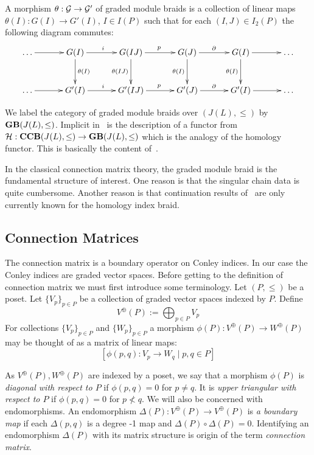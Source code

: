A morphism $\theta:{\mathcal G}\to {\mathcal G}'$ of graded module braids is a collection of linear maps $\theta(I):G(I)\to G'(I)$, $I\in I(P)$ such that for each $(I,J)\in I_2(P)$ the following diagram commutes:
\[
\xymatrixrowsep{0.4in}
\xymatrixcolsep{0.45in}
\xymatrix{
\ldots \ar@{->}[r] & G(I) \ar@{->}[d]^{\theta(I)} \ar@{->}[r]^{i} & G(IJ) \ar@{->}[d]_{\theta(IJ)} \ar@{->}[r]^{p} & G(J) \ar@{->}[d]_{\theta(I)} \ar@{->}[r]^{\partial} & G(I) \ar@{->}[d]_{\theta(I)} \ar@{->}[r] & \ldots\\
\ldots \ar@{->}[r] & G'(I) \ar@{->}[r]^{i} & G'(IJ) \ar@{->}[r]^{p} & G'(J) \ar@{->}[r]^{\partial} & G'(I) \ar@{->}[r] &\ldots
}
\]

We label the category of graded module braids over $(J(L),\leq)$ by ${\bf GB}(J(L),\leq)$.  Implicit in~\cite{fran} is the description of a functor from ${\mathcal H}:{\bf CCB}(J(L),\leq)\to {\bf GB}(J(L),\leq)$ which is the analogy of the homology functor.  This is basically the content of~\cite[Proposition 2.7]{fran}.


\begin{rem}
In the classical connection matrix theory, the graded module braid is the fundamental structure of interest.  One reason is that the singular chain data is quite cumbersome.  Another reason is that continuation results of~\cite{fran3}  are only currently known for the homology index braid.
\end{rem}


\subsection{Connection Matrices}

The connection matrix is a boundary operator on Conley indices.  In our case the Conley indices are graded vector spaces.  Before getting to the definition of connection matrix we must first introduce some terminology.  Let $(P,\leq)$ be a poset.  Let $\{V_p\}_{p\in P}$ be a collection of graded vector spaces indexed by $P$.  Define $$V^\oplus(P) := \bigoplus_{p\in P} V_p$$  For collections $\{V_p\}_{p\in P}$ and $\{W_p\}_{p\in P}$ a morphism $\phi(P):V^\oplus(P)\to W^\oplus(P)$ may be thought of as a matrix of linear maps: $$[\phi(p,q):V_p\to W_q\mid p,q\in P]$$


As $V^\oplus(P),W^\oplus(P)$ are indexed by a poset, we say that a morphism $\phi(P)$ is {\em diagonal with respect to $P$} if $\phi(p,q)=0$ for $p\neq q$.  It is {\em upper triangular with respect to $P$} if $\phi(p,q)=0$ for $p\nless q$.  We will also be concerned with endomorphisms.  An endomorphism $\Delta(P):V^\oplus(P)\to V^\oplus(P)$ is {\em a boundary map} if each $\Delta(p,q)$ is a degree -1 map and $\Delta(P)\circ \Delta(P) = 0$.  Identifying an endomorphism $\Delta(P)$ with its matrix structure is origin of the term {\em connection matrix}.  

